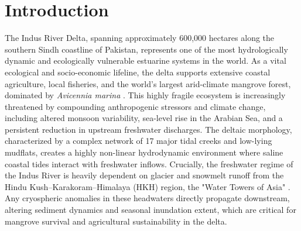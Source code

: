 \documentclass[preprint,12pt]{elsarticle}
\begin{document}
\section{Introduction}
The Indus River Delta, spanning approximately 600,000 hectares along the southern Sindh coastline of Pakistan, represents one of the most hydrologically dynamic and ecologically vulnerable estuarine systems in the world. As a vital ecological and socio-economic lifeline, the delta supports extensive coastal agriculture, local fisheries, and the world's largest arid-climate mangrove forest, dominated by \textit{Avicennia marina} \cite{rehman_indus_2024}. This highly fragile ecosystem is increasingly threatened by compounding anthropogenic stressors and climate change, including altered monsoon variability, sea-level rise in the Arabian Sea, and a persistent reduction in upstream freshwater discharges. The deltaic morphology, characterized by a complex network of 17 major tidal creeks and low-lying mudflats, creates a highly non-linear hydrodynamic environment where saline coastal tides interact with freshwater inflows. Crucially, the freshwater regime of the Indus River is heavily dependent on glacier and snowmelt runoff from the Hindu Kush--Karakoram--Himalaya (HKH) region, the "Water Towers of Asia" \cite{immerzeel_science_2010, lutz_consistent_2014}. Any cryospheric anomalies in these headwaters directly propagate downstream, altering sediment dynamics and seasonal inundation extent, which are critical for mangrove survival and agricultural sustainability in the delta.
\end{document}
